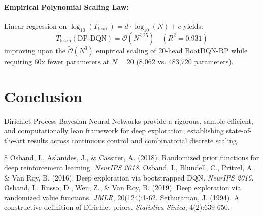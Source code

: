 \documentclass{article}
\begin{document}
\paragraph{Empirical Polynomial Scaling Law:}
Linear regression on $\log_{10}(T_{\text{learn}}) = d \cdot \log_{10}(N) + c$ yields:
\begin{equation}
    T_{\text{learn}}(\text{DP-DQN}) = \mathcal{O}(N^{2.25}) \quad (R^2 = 0.931)
\end{equation}
improving upon the $\tilde{\mathcal{O}}(N^3)$ empirical scaling of 20-head BootDQN-RP while requiring 60x fewer parameters at $N=20$ (8,062 vs. 483,720 parameters).

\section{Conclusion}
Dirichlet Process Bayesian Neural Networks provide a rigorous, sample-efficient, and computationally lean framework for deep exploration, establishing state-of-the-art results across continuous control and combinatorial discrete scaling.


\begin{thebibliography}{8}
 Osband, I., Aslanides, J., \& Cassirer, A. (2018). Randomized prior functions for deep reinforcement learning. \textit{NeurIPS 2018}.
 Osband, I., Blundell, C., Pritzel, A., \& Van Roy, B. (2016). Deep exploration via bootstrapped DQN. \textit{NeurIPS 2016}.
 Osband, I., Russo, D., Wen, Z., \& Van Roy, B. (2019). Deep exploration via randomized value functions. \textit{JMLR}, 20(124):1-62.
 Sethuraman, J. (1994). A constructive definition of Dirichlet priors. \textit{Statistica Sinica}, 4(2):639-650.
\end{thebibliography}
\end{document}
